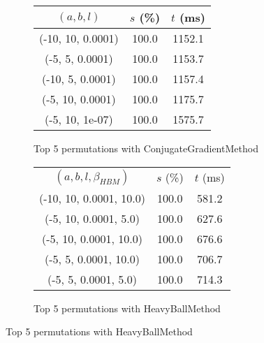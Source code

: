 \begin{figure}[H]
\begin{subfigure}[ht]{.5\textwidth}
\begin{tabular}{|c|c|c|}
\rowcolor{gray!25}
$(a,b,l)$ & $s$ (\%) & $t$ (ms) \\
\hline
(-10, 10, 0.0001) & 100.0 & 1152.1 \\
(-5, 5, 0.0001) & 100.0 & 1153.7 \\
(-10, 5, 0.0001) & 100.0 & 1157.4 \\
(-5, 10, 0.0001) & 100.0 & 1175.7 \\
(-5, 10, 1e-07) & 100.0 & 1575.7 \\
\hline
\end{tabular}
\caption{Top 5 permutations with ConjugateGradientMethod}
\label{subfig:param_comp_MatrixSquareSum_ConjugateGradientMethod_BisectionSearch}
\end{subfigure}
\hfill
\begin{subfigure}[ht]{.5\textwidth}
\begin{tabular}{|c|c|c|}
\hline
\rowcolor{gray!25}
\multicolumn{3}{|c|}{HeavyBallMethod} \\
\hline
\rowcolor{gray!25}
$(a,b,l,\beta_{HBM})$ & $s$ (\%) & $t$ (ms) \\
\hline
(-10, 10, 0.0001, 10.0) & 100.0 & 581.2 \\
(-5, 10, 0.0001, 5.0) & 100.0 & 627.6 \\
(-5, 10, 0.0001, 10.0) & 100.0 & 676.6 \\
(-5, 5, 0.0001, 10.0) & 100.0 & 706.7 \\
(-5, 5, 0.0001, 5.0) & 100.0 & 714.3 \\
\hline
\end{tabular}
\caption{Top 5 permutations with HeavyBallMethod}
\label{subfig:param_comp_MatrixSquareSum_HeavyBallMethod_BisectionSearch}
\end{subfigure}
\end{figure}

